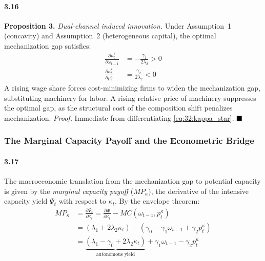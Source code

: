 \paragraph{3.16}
\textbf{Proposition 3.} \textit{Dual-channel induced
	innovation.} Under Assumption~1 (concavity) and
Assumption~2 (heterogeneous capital), the optimal
mechanization gap satisfies:
\begin{align}
	\frac{\partial \kappa_t^*}{\partial \omega_{t-1}}
	&= -\frac{\gamma_1}{2\lambda_2} > 0
	\label{eq:32:cs_omega} \\
	\frac{\partial \kappa_t^*}{\partial p^\kappa_t}
	&= \frac{\gamma_2}{2\lambda_2} < 0
	\label{eq:32:cs_price}
\end{align}
A rising wage share forces cost-minimizing firms to widen
the mechanization gap, substituting machinery for labor.
A rising relative price of machinery suppresses the optimal
gap, as the structural cost of the composition shift
penalizes mechanization. \textit{Proof.} Immediate from
differentiating \eqref{eq:32:kappa_star}. $\hfill\blacksquare$

\subsubsection{The Marginal Capacity Payoff and the
	Econometric Bridge}

\paragraph{3.17}
The macroeconomic translation from the mechanization gap to
potential capacity is given by the \textit{marginal capacity payoff} ($MP_\kappa$), the derivative of the
intensive capacity yield $\Psi_t$ with respect to $\kappa_t$.
By the envelope theorem:
\begin{align}
	MP_\kappa &= \frac{\partial \Psi_t}{\partial \kappa_t}
	= \frac{\partial \Phi}{\partial \kappa_t}
	- MC(\omega_{t-1}, p^\kappa_t)
	\label{eq:32:MP_env} \\
	&= (\lambda_1 + 2\lambda_2 \kappa_t)
	- (\gamma_0 - \gamma_1 \omega_{t-1} + \gamma_2 p^\kappa_t)
	\label{eq:32:MP_expanded} \\
	&= \underbrace{(\lambda_1 - \gamma_0
		+ 2\lambda_2 \kappa_t)}_{\text{autonomous yield}}
	+ \gamma_1 \omega_{t-1} - \gamma_2 p^\kappa_t
	\label{eq:32:MP_rearranged}
\end{align}

